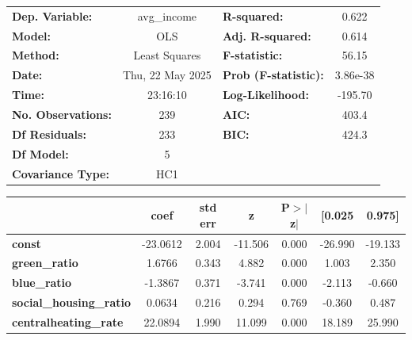 \begin{center}
\begin{tabular}{lclc}
\toprule
\textbf{Dep. Variable:}           &   avg\_income    & \textbf{  R-squared:         } &     0.622   \\
\textbf{Model:}                   &       OLS        & \textbf{  Adj. R-squared:    } &     0.614   \\
\textbf{Method:}                  &  Least Squares   & \textbf{  F-statistic:       } &     56.15   \\
\textbf{Date:}                    & Thu, 22 May 2025 & \textbf{  Prob (F-statistic):} &  3.86e-38   \\
\textbf{Time:}                    &     23:16:10     & \textbf{  Log-Likelihood:    } &   -195.70   \\
\textbf{No. Observations:}        &         239      & \textbf{  AIC:               } &     403.4   \\
\textbf{Df Residuals:}            &         233      & \textbf{  BIC:               } &     424.3   \\
\textbf{Df Model:}                &           5      & \textbf{                     } &             \\
\textbf{Covariance Type:}         &       HC1        & \textbf{                     } &             \\
\bottomrule
\end{tabular}
\begin{tabular}{lcccccc}
                                  & \textbf{coef} & \textbf{std err} & \textbf{z} & \textbf{P$> |$z$|$} & \textbf{[0.025} & \textbf{0.975]}  \\
\midrule
\textbf{const}                    &     -23.0612  &        2.004     &   -11.506  &         0.000        &      -26.990    &      -19.133     \\
\textbf{green\_ratio}             &       1.6766  &        0.343     &     4.882  &         0.000        &        1.003    &        2.350     \\
\textbf{blue\_ratio}              &      -1.3867  &        0.371     &    -3.741  &         0.000        &       -2.113    &       -0.660     \\
\textbf{social\_housing\_ratio}   &       0.0634  &        0.216     &     0.294  &         0.769        &       -0.360    &        0.487     \\
\textbf{centralheating\_rate}     &      22.0894  &        1.990     &    11.099  &         0.000        &       18.189    &       25.990     \\

\end{tabular}
\end{center}
